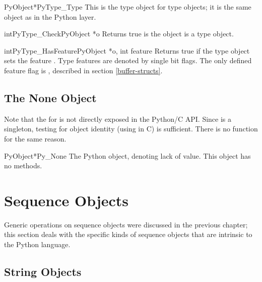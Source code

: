 \documentclass{manual}
\begin{document}
\begin{cvardesc}{PyObject*}{PyType_Type}
This is the type object for type objects; it is the same object as
 in the Python layer.
\end{cvardesc}

\begin{cfuncdesc}{int}{PyType_Check}{PyObject *o}
Returns true is the object  is a type object.
\end{cfuncdesc}

\begin{cfuncdesc}{int}{PyType_HasFeature}{PyObject *o, int feature}
Returns true if the type object  sets the feature
.  Type features are denoted by single bit flags.  The
only defined feature flag is , 
described in section \ref{buffer-structs}.
\end{cfuncdesc}


\subsection{The None Object \label{noneObject}}

Note that the  for  is not directly
exposed in the Python/C API.  Since  is a singleton,
testing for object identity (using \samp{==} in C) is sufficient.
There is no  function for the same reason.

\begin{cvardesc}{PyObject*}{Py_None}
The Python  object, denoting lack of value.  This object has
no methods.
\end{cvardesc}


\section{Sequence Objects \label{sequenceObjects}}

Generic operations on sequence objects were discussed in the previous 
chapter; this section deals with the specific kinds of sequence 
objects that are intrinsic to the Python language.


\subsection{String Objects \label{stringObjects}}
\end{document}
